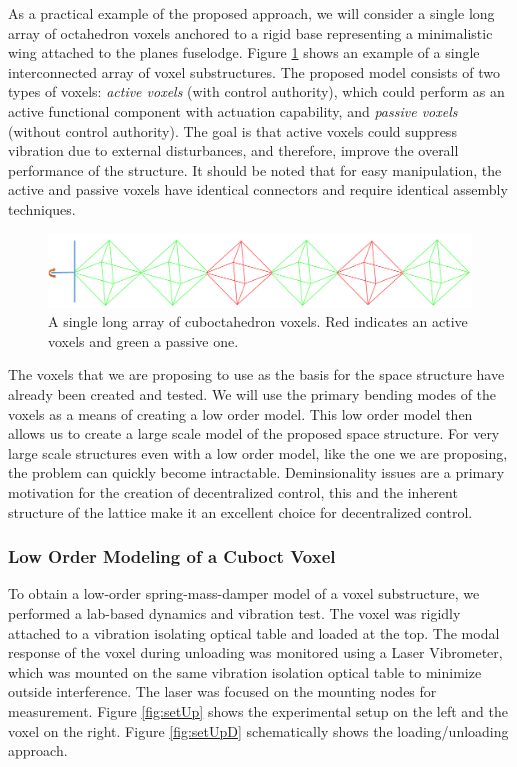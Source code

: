 \documentclass[11pt]{ucthesis}
\begin{document}
As a practical example of the proposed approach, we will consider a single long array of octahedron voxels anchored to a rigid base representing a minimalistic wing attached to the planes fuselodge. Figure \ref{fig:interconnected} shows an example of a single interconnected array of voxel substructures. The proposed model consists of two types of voxels: {\it active voxels} (with control authority), which could perform as an active functional component with actuation capability,  and {\it passive voxels} (without control authority). The goal is that active voxels could suppress vibration due to external disturbances, and therefore, improve the overall performance of the structure. It should be noted that for easy manipulation, the active and passive voxels have identical connectors and require identical assembly techniques.  

\begin{figure}[h]
\centering
\includegraphics[width=0.75\linewidth]{Figures/exampleInterconnectedStructure.png}
\caption{A single long array of cuboctahedron voxels. Red indicates an active voxels and green a passive one.}
\label{fig:interconnected}
\end{figure}

The voxels that we are proposing to use as the basis for the space structure have already been created and tested.\cite{jenett2016meso} We will use the primary bending modes of the voxels as a means of creating a low order model. This low order model then allows us to create a large scale model of the proposed space structure. For very large scale structures even with a low order model, like the one we are proposing, the problem can quickly become intractable. Deminsionality issues are a primary motivation for the creation of decentralized control\cite{bakule2008decentralized}, this and the inherent structure of the lattice make it an excellent choice for decentralized control.

\subsubsection{Low Order Modeling of a Cuboct Voxel}
\label{sec:model}
To obtain a low-order spring-mass-damper model of a voxel substructure, we performed a lab-based dynamics and vibration test. The voxel was rigidly attached to a vibration isolating optical table and loaded at the top. The modal response of the voxel during unloading was monitored using a Laser Vibrometer, which was mounted on the same vibration isolation optical table to minimize outside interference. The laser was focused on the mounting nodes for measurement. Figure \ref{fig:setUp} shows the experimental setup on the left and the voxel on the right. Figure \ref{fig:setUpD} schematically shows the loading/unloading approach.
\end{document}
